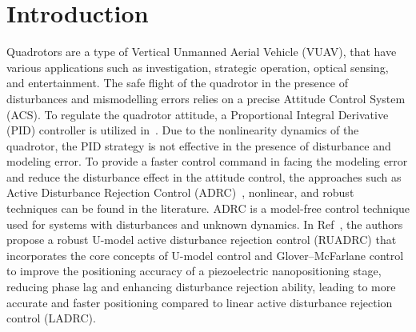 \documentclass[3p]{elsarticle}
\begin{document}
\section{Introduction}\label{sec:intro}

\noindent Quadrotors are a type of Vertical Unmanned Aerial Vehicle (VUAV), that have various applications such as investigation, strategic operation, optical sensing, and entertainment. The safe flight of the quadrotor in the presence of disturbances and mismodelling errors relies on a precise Attitude Control System (ACS). To regulate the quadrotor attitude, a Proportional Integral Derivative (PID) controller is utilized in~\cite{article_Abdul, article_Bolandi}. Due to the nonlinearity dynamics of the quadrotor, the PID strategy is not effective in the presence of disturbance and modeling error. To provide a faster control command in facing the modeling error and reduce the disturbance effect in the attitude control, the approaches such as Active Disturbance Rejection Control (ADRC)~\cite{CHENG2023}, nonlinear, and robust~\cite{DING2022580, CORTESROMERO202063} techniques can be found in the literature. ADRC is a model-free control technique used for systems with disturbances and unknown dynamics. In Ref~\cite{WEI2022599}, the authors propose a robust U-model active disturbance rejection control (RUADRC) that incorporates the core concepts of U-model control and Glover–McFarlane control to improve the positioning accuracy of a piezoelectric nanopositioning stage, reducing phase lag and enhancing disturbance rejection ability, leading to more accurate and faster positioning compared to linear active disturbance rejection control (LADRC). 
\end{document}
